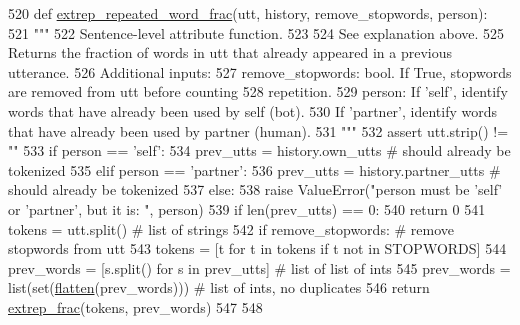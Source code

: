 \begin{DoxyCode}
520 \textcolor{keyword}{def }\hyperlink{namespaceprojects_1_1controllable__dialogue_1_1controllable__seq2seq_1_1controls_a0d42f675e7a8008b5300de33d6b393b1}{extrep\_repeated\_word\_frac}(utt, history, remove\_stopwords, person):
521     \textcolor{stringliteral}{"""}
522 \textcolor{stringliteral}{    Sentence-level attribute function.}
523 \textcolor{stringliteral}{}
524 \textcolor{stringliteral}{    See explanation above.}
525 \textcolor{stringliteral}{    Returns the fraction of words in utt that already appeared in a previous utterance.}
526 \textcolor{stringliteral}{    Additional inputs:}
527 \textcolor{stringliteral}{      remove\_stopwords: bool. If True, stopwords are removed from utt before counting}
528 \textcolor{stringliteral}{        repetition.}
529 \textcolor{stringliteral}{      person: If 'self', identify words that have already been used by self (bot).}
530 \textcolor{stringliteral}{        If 'partner', identify words that have already been used by partner (human).}
531 \textcolor{stringliteral}{    """}
532     \textcolor{keyword}{assert} utt.strip() != \textcolor{stringliteral}{""}
533     \textcolor{keywordflow}{if} person == \textcolor{stringliteral}{'self'}:
534         prev\_utts = history.own\_utts  \textcolor{comment}{# should already be tokenized}
535     \textcolor{keywordflow}{elif} person == \textcolor{stringliteral}{'partner'}:
536         prev\_utts = history.partner\_utts  \textcolor{comment}{# should already be tokenized}
537     \textcolor{keywordflow}{else}:
538         \textcolor{keywordflow}{raise} ValueError(\textcolor{stringliteral}{"person must be 'self' or 'partner', but it is: "}, person)
539     \textcolor{keywordflow}{if} len(prev\_utts) == 0:
540         \textcolor{keywordflow}{return} 0
541     tokens = utt.split()  \textcolor{comment}{# list of strings}
542     \textcolor{keywordflow}{if} remove\_stopwords:  \textcolor{comment}{# remove stopwords from utt}
543         tokens = [t \textcolor{keywordflow}{for} t \textcolor{keywordflow}{in} tokens \textcolor{keywordflow}{if} t \textcolor{keywordflow}{not} \textcolor{keywordflow}{in} STOPWORDS]
544     prev\_words = [s.split() \textcolor{keywordflow}{for} s \textcolor{keywordflow}{in} prev\_utts]  \textcolor{comment}{# list of list of ints}
545     prev\_words = list(set(\hyperlink{namespaceprojects_1_1controllable__dialogue_1_1controllable__seq2seq_1_1controls_a0db4b9d9584cef90aa2515a75e741774}{flatten}(prev\_words)))  \textcolor{comment}{# list of ints, no duplicates}
546     \textcolor{keywordflow}{return} \hyperlink{namespaceprojects_1_1controllable__dialogue_1_1controllable__seq2seq_1_1controls_a24fbafb2553fb93db247bb7e2339b1e4}{extrep\_frac}(tokens, prev\_words)
547 
548 
\end{DoxyCode}
